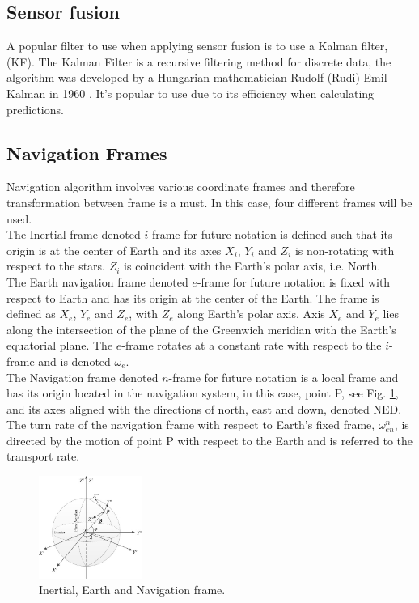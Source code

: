 \subsection{Sensor fusion}
A popular filter to use when applying sensor fusion is to use a Kalman filter, (KF). The Kalman Filter is a recursive filtering method for discrete data, the algorithm was developed by a Hungarian mathematician Rudolf (Rudi) Emil Kalman in 1960 \cite{boken}. It's popular to use due to its efficiency when calculating predictions. \cite{kf eff}

\subsection{Navigation Frames}
Navigation algorithm involves various coordinate frames and therefore transformation between frame is a must. In this case, four different frames will be used.\\

The Inertial frame denoted $i$-frame for future notation is defined such that its origin is at the center of Earth and its axes $X_i$, $Y_i$ and $Z_i$ is non-rotating with respect to the stars. $Z_i$ is coincident with the Earth's polar axis, i.e. North.\\

The Earth navigation frame denoted $e$-frame for future notation is fixed with respect to Earth and has its origin at the center of the Earth. The frame is defined as $X_e$, $Y_e$ and $Z_e$, with $Z_e$ along Earth's polar axis. Axis $X_e$ and $Y_e$ lies along the intersection of the plane of the Greenwich meridian with the Earth's equatorial plane. The $e$-frame rotates at a constant rate with respect to the $i$-frame and is denoted $\omega_e$.\\

The Navigation frame denoted $n$-frame for future notation is a local frame and has its origin located in the navigation system, in this case, point P, see Fig. \ref{WGS}, and its axes aligned with the directions of north, east and down, denoted NED. The turn rate of the navigation frame with respect to Earth's fixed frame, $\omega_{en}^n$, is directed by the motion of point P with respect to the Earth and is referred to the transport rate.   

\begin{figure}[H]
\centering
\includegraphics[width=0.3\textwidth]{Figures/WGS-coordinates.png}
\caption{Inertial, Earth and Navigation frame.}
\label{WGS}
\end{figure}

